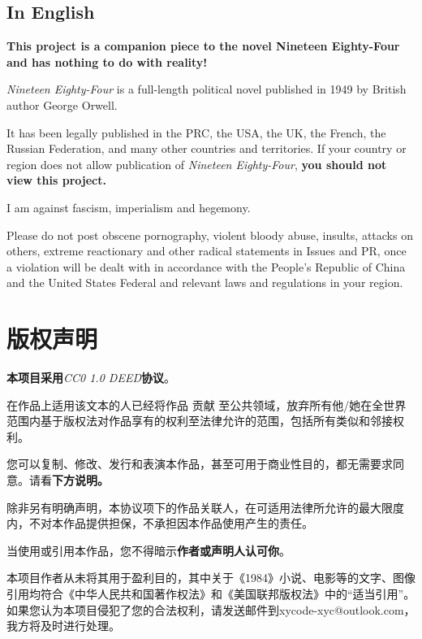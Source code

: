 \documentclass[lang=cn, color=black]{elegantbook}
\begin{document}
            \section*{In English}
                \textbf{This project is a companion piece to the novel Nineteen Eighty-Four and has nothing to do with reality!}

                \textit{Nineteen Eighty-Four} is a full-length political novel published in 1949 by British author George Orwell.

                It has been legally published in the PRC, the USA, the UK, the French, the Russian Federation, and many other countries and territories. If your country or region does not allow publication of \textit{Nineteen Eighty-Four}, \textbf{you should not view this project.}

                I am against fascism, imperialism and hegemony.

                Please do not post obscene pornography, violent bloody abuse, insults, attacks on others, extreme reactionary and other radical statements in Issues and PR, once a violation will be dealt with in accordance with the People's Republic of China and the United States Federal and relevant laws and regulations in your region.
    
        \chapter*{版权声明}
            \begin{center}
                \large
                \textbf{本项目采用}\textit{CC0 1.0 DEED}\textbf{协议}。
            \end{center}

            在作品上适用该文本的人已经将作品 贡献 至公共领域，放弃所有他/她在全世界范围内基于版权法对作品享有的权利至法律允许的范围，包括所有类似和邻接权利。

            您可以复制、修改、发行和表演本作品，甚至可用于商业性目的，都无需要求同意。请看\textbf{下方说明。}

            除非另有明确声明，本协议项下的作品关联人，在可适用法律所允许的最大限度内，不对本作品提供担保，不承担因本作品使用产生的责任。

            当使用或引用本作品，您不得暗示\textbf{作者或声明人认可你}。

            本项目作者从未将其用于盈利目的，其中关于《1984》小说、电影等的文字、图像引用均符合《中华人民共和国著作权法》和《美国联邦版权法》中的“适当引用”。如果您认为本项目侵犯了您的合法权利，请发送邮件到xycode-xyc@outlook.com，我方将及时进行处理。
        
\end{document}
